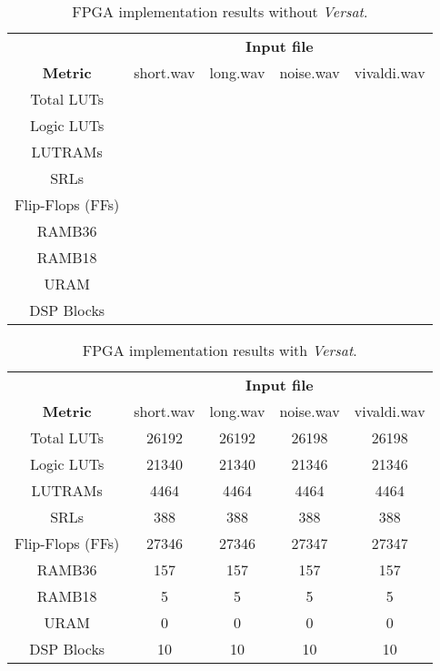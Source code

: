 \begin{table}[H]
    \centering
    \begin{tabular}{c|c|c|c|c|}
    \cline{2-5}
    \multicolumn{1}{c|}{}  & \multicolumn{4}{c|}{\textbf{Input file}} \\
    \cline{1-5}
    \multicolumn{1}{|c|}{\textbf{Metric}} & short.wav & long.wav & noise.wav & vivaldi.wav \\
    \hline
    \multicolumn{1}{|c|}{Total LUTs} &  &  &  &  \\ 
    \hline
    \multicolumn{1}{|c|}{Logic LUTs}  &  &  &   &  \\ 
    \hline
    \multicolumn{1}{|c|}{LUTRAMs}  &  &  &  &  \\ 
    \hline
    \multicolumn{1}{|c|}{SRLs}  &  &  &  &  \\ 
    \hline
    \multicolumn{1}{|c|}{Flip-Flops (FFs)}  &  &  &  &  \\ 
    \hline
    \multicolumn{1}{|c|}{RAMB36}  &  &  &  &   \\ 
    \hline
    \multicolumn{1}{|c|}{RAMB18}  &  &  &  &  \\ 
    \hline
    \multicolumn{1}{|c|}{URAM}  &  &  &  &  \\ 
    \hline
    \multicolumn{1}{|c|}{DSP Blocks}  &  &  &  &  \\ 
    \hline
    \end{tabular}
    \caption{FPGA implementation results without \textit{Versat}.}
    \label{implementation1}
\end{table}

\begin{table}[H]
    \centering
    \begin{tabular}{c|c|c|c|c|}
    \cline{2-5}
    \multicolumn{1}{c|}{}  & \multicolumn{4}{c|}{\textbf{Input file}} \\
    \cline{1-5}
    \multicolumn{1}{|c|}{\textbf{Metric}} & short.wav & long.wav & noise.wav & vivaldi.wav \\
    \hline
    \multicolumn{1}{|c|}{Total LUTs} & 26192 & 26192 & 26198 & 26198 \\ 
    \hline
    \multicolumn{1}{|c|}{Logic LUTs}  & 21340 & 21340 & 21346  & 21346 \\ 
    \hline
    \multicolumn{1}{|c|}{LUTRAMs}  & 4464 & 4464 & 4464 & 4464 \\ 
    \hline
    \multicolumn{1}{|c|}{SRLs}  & 388 & 388 & 388 & 388 \\ 
    \hline
    \multicolumn{1}{|c|}{Flip-Flops (FFs)}  & 27346 & 27346 & 27347 & 27347 \\ 
    \hline
    \multicolumn{1}{|c|}{RAMB36}  & 157 & 157 & 157 &  157 \\ 
    \hline
    \multicolumn{1}{|c|}{RAMB18}  & 5 & 5 & 5 & 5 \\ 
    \hline
    \multicolumn{1}{|c|}{URAM}  & 0 & 0 & 0 & 0 \\ 
    \hline
    \multicolumn{1}{|c|}{DSP Blocks}  & 10 & 10 & 10 & 10 \\ 
    \hline
    \end{tabular}
    \caption{FPGA implementation results with \textit{Versat}.}
    \label{implementation2}
\end{table}

